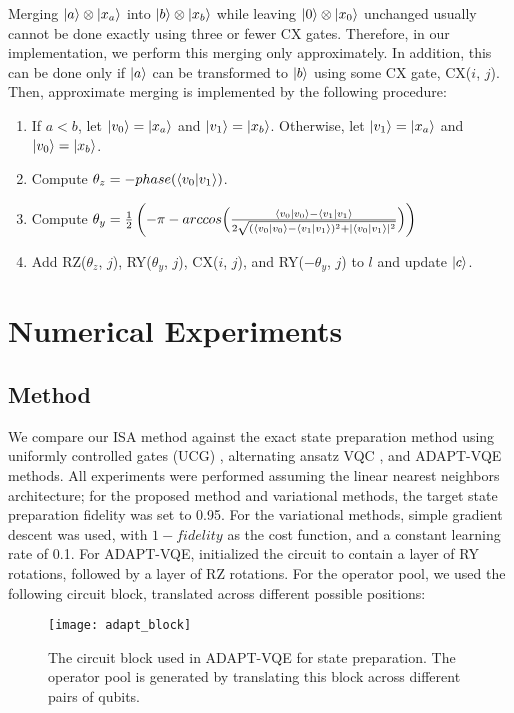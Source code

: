 \documentclass{article}
\begin{document}
Merging $\mathinner{|{a}\rangle} \otimes \mathinner{|{x_a}\rangle}$ into $\mathinner{|{b}\rangle} \otimes \mathinner{|{x_b}\rangle}$
while leaving $\mathinner{|{0}\rangle} \otimes \mathinner{|{x_0}\rangle}$ unchanged usually cannot be done 
exactly using three or fewer CX gates. Therefore, in our implementation, we
perform this merging only approximately. In addition, this can be done only
if $\mathinner{|{a}\rangle}$ can be transformed to $\mathinner{|{b}\rangle}$ using some CX gate, CX($i$, $j$).
Then, approximate merging is implemented by the following procedure:
\begin{enumerate}
    \item If $a < b$, let $\mathinner{|{v_0}\rangle} = \mathinner{|{x_a}\rangle}$ and $\mathinner{|{v_1}\rangle} = \mathinner{|{x_b}\rangle}$.
    Otherwise, let $\mathinner{|{v_1}\rangle} = \mathinner{|{x_a}\rangle}$ and $\mathinner{|{v_0}\rangle} = \mathinner{|{x_b}\rangle}$.
    \item Compute $\theta_z = -phase(\mathinner{\langle{v_0|v_1}\rangle})$.
    \item Compute $\theta_y = \frac{1}{2}\left(-\pi - arccos\Bigl(\frac{\mathinner{\langle{v_0 | v_0}\rangle}
      - \mathinner{\langle{v_1 | v_1}\rangle}}{2\sqrt{(\mathinner{\langle{v_0 | v_0}\rangle} - \mathinner{\langle{v_1 | v_1}\rangle})^2
      + |\mathinner{\langle{v_0 | v_1}\rangle}|^2}}\Bigr)\right)$
    \item Add RZ($\theta_z$, $j$), RY($\theta_y$, $j$), CX($i$, $j$), and
      RY($-\theta_y$, $j$) to $l$ and update $\mathinner{|{c}\rangle}$.
\end{enumerate}

\section{Numerical Experiments}
\subsection{Method}
We compare our ISA method against the exact state preparation method using
uniformly controlled gates (UCG) \cite{bergholm2005quantum}, alternating ansatz
VQC \cite{zhang2020toward}, and ADAPT-VQE \cite{grimsley2019adaptive} methods.
All
experiments were performed assuming the linear nearest neighbors architecture;
for the proposed method and variational methods, the target state preparation
fidelity was set to 0.95. For the variational methods, simple gradient descent
was used, with $1 - fidelity$ as the cost function, and a constant learning
rate of 0.1. For ADAPT-VQE, initialized the circuit to contain a layer of RY
rotations, followed by a layer of RZ rotations. For the operator pool, we used 
the following circuit block, translated across different possible positions:

\begin{figure}[H]
\centering
\texttt{[image: adapt\_block]}
\caption{The circuit block used in ADAPT-VQE for state preparation. The operator
pool is generated by translating this block across different pairs of qubits.}
\end{figure}
\end{document}
